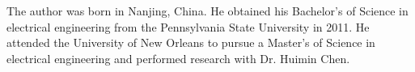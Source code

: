 The author was born in Nanjing, China. He obtained his Bachelor's of Science in electrical engineering from the Pennsylvania State University in 2011. He attended the University of New Orleans to pursue a Master's of Science in electrical engineering and performed research with Dr. Huimin Chen.